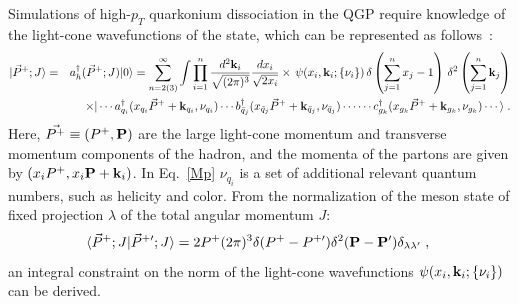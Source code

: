 \documentclass[article,showpacs,preprintnumbers,amsmath,amssymb]{revtex4}
\newcommand{\bfk}{{\bf{k}}}
\begin{document}
Simulations of high-$p_T$ quarkonium dissociation in the QGP require
knowledge of the light-cone wavefunctions of the state, which
can be represented as follows~\cite{hep-ph/0611109,Sharma:2009hn}:  
\begin{eqnarray}
 |\vec{P}^+;J \rangle & = &  {a}_h^\dagger(\vec{P}^+;J)  |0 \rangle
= \sum_{n = 2(3)}^\infty  \int \prod_{i=1}^n  \frac{d^2{\bf k}_i}{\sqrt{(2\pi)^{3}}}
\frac{dx_i}{ \sqrt{2 x_i}} 
 \times \, \psi(x_i,{\bf k}_i ; \{\nu_i\}) \,  \delta \left(\sum_{j=1}^n x_j -1 \right) \, 
\delta^2  \left( \sum_{j=1}^n{{\bf k}_j} \right)  \nonumber \\
&&  \times |\cdots  {a}^\dagger_{q_i}(x_{q_i}\vec{P}^+ + {\bf k}_{q_i}, \nu_{q_i} ) \cdots 
 {b}^\dagger_{\bar{q}_j}(x_{\bar{q}_j}\vec{P}^+ + {\bf k}_{\bar{q}_j}, \nu_{{\bar{q}_j} })
\cdots   
 \cdots   {c}^\dagger_{{g}_k}(x_{{g}_k}\vec{P}^+ + {\bf k}_{{g}_k}, \nu_{{{g}_k} } ) 
\cdots \rangle \; .
\label{Mp}
\end{eqnarray}   
Here,  $\vec{P^+} \equiv (P^+,{\bf P})$  are the large light-cone momentum 
and transverse momentum components of the hadron, and the momenta of the partons 
are given by $(x_iP^+,x_i{\bf P}+{\bf k}_i)$.  In Eq.~\ref{Mp}
$\nu_{q_i}$ is a set of additional relevant quantum numbers, such as helicity 
and color. From the normalization of the meson state of fixed projection $\lambda$
of the total angular momentum $J$: 
\begin{equation}
\langle \vec{P}^+;J  |\vec{P}^{+ \prime};J \rangle
= 2P^+ (2\pi)^3 \delta(P^+-P^{+ \prime}) \delta^2 ({\bf P}-{\bf P}^\prime)
\delta_{\lambda \lambda^\prime}\;,~\label{mesonnorm}
\end{equation}
an integral constraint  on the norm of the light-cone wavefunctions 
$\psi(x_i,\bfk_i;\{\nu_i\})$ can be derived.  
\end{document}
